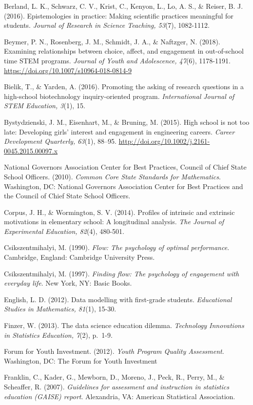 \documentclass[]{book}
\theoremstyle{definition}
\theoremstyle{definition}
\theoremstyle{definition}
\theoremstyle{remark}
\begin{document}
Berland, L. K., Schwarz, C. V., Krist, C., Kenyon, L., Lo, A. S., \&
Reiser, B. J. (2016). Epistemologies in practice: Making scientific
practices meaningful for students. \emph{Journal of Research in Science
Teaching, 53}(7), 1082-1112.

Beymer, P. N., Rosenberg, J. M., Schmidt, J. A., \& Naftzger, N. (2018).
Examining relationships between choice, affect, and engagement in
out-of-school time STEM programs. \emph{Journal of Youth and
Adolescence, 47}(6), 1178-1191.
\url{https://doi.org/10.1007/s10964-018-0814-9}

Bielik, T., \& Yarden, A. (2016). Promoting the asking of research
questions in a high-school biotechnology inquiry-oriented program.
\emph{International Journal of STEM Education, 3}(1), 15.

Bystydzienski, J. M., Eisenhart, M., \& Bruning, M. (2015). High school
is not too late: Developing girls' interest and engagement in
engineering careers. \emph{Career Development Quarterly, 63}(1), 88--95.
\url{http://doi.org/10.1002/j.2161-0045.2015.00097.x}

National Governors Association Center for Best Practices, Council of
Chief State School Officers. (2010). \emph{Common Core State Standards
for Mathematics}. Washington, DC: National Governors Association Center
for Best Practices and the Council of Chief State School Officers.

Corpus, J. H., \& Wormington, S. V. (2014). Profiles of intrinsic and
extrinsic motivations in elementary school: A longitudinal analysis.
\emph{The Journal of Experimental Education, 82}(4), 480-501.

Csikszentmihalyi, M. (1990). \emph{Flow: The psychology of optimal
performance}. Cambridge, England: Cambridge University Press.

Csikszentmihalyi, M. (1997). \emph{Finding flow: The psychology of
engagement with everyday life}. New York, NY: Basic Books.

English, L. D. (2012). Data modelling with first-grade students.
\emph{Educational Studies in Mathematics, 81}(1), 15-30.

Finzer, W. (2013). The data science education dilemma. \emph{Technology
Innovations in Statistics Education, 7}(2), p.~1-9.

Forum for Youth Investment. (2012). \emph{Youth Program Quality
Assessment}. Washington, DC: The Forum for Youth Investment

Franklin, C., Kader, G., Mewborn, D., Moreno, J., Peck, R., Perry, M.,
\& Scheaffer, R. (2007). \emph{Guidelines for assessment and instruction
in statistics education (GAISE) report}. Alexandria, VA: American
Statistical Association.
\end{document}
